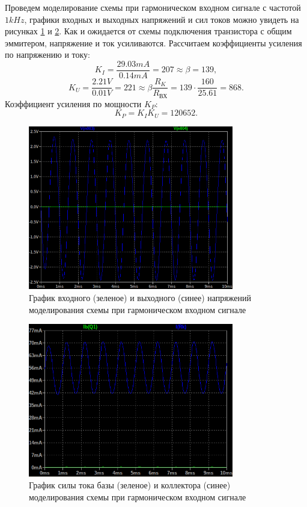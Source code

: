 Проведем моделирование схемы при гармоническом входном сигнале с частотой $1kHz$,
графики входных и выходных напряжений и сил токов можно увидеть на рисунках
\ref{fig:энднапряжения} и \ref{fig:эндток}. Как и ожидается от схемы подключения
транзистора с общим эммитером, напряжение и ток усиливаются. Рассчитаем
коэффициенты усиления по напряжению и току:
\begin{equation*}
    K_I=\frac{29.03mA}{0.14mA}=207\approx\beta=139,
\end{equation*}
\begin{equation*}
    K_U=\frac{2.21V}{0.01V}=221\approx\beta\frac{R_K}{R_\text{ВХ}}=139\cdot\frac{160}{25.61}=868.
\end{equation*}
Коэффициент усиления по мощности $K_P$:
\begin{equation*}
    K_P=K_IK_U=120652.
\end{equation*}

\begin{figure}[H]
    \centering
    \includegraphics[width=0.8\textwidth]{figs/энднапряжения.png}
    \caption{График входного (зеленое) и выходного (синее) напряжений моделирования схемы при гармоническом входном сигнале}
    \label{fig:энднапряжения}
\end{figure}
\begin{figure}[H]
    \centering
    \includegraphics[width=0.8\textwidth]{figs/эндток.png}
    \caption{График силы тока базы (зеленое) и коллектора (синее) моделирования схемы при гармоническом входном сигнале}
    \label{fig:эндток}
\end{figure}


